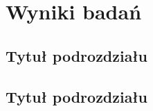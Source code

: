\chapter{Wyniki badań}
\label{chap:wyniki}



\section{Tytuł podrozdziału}


\section{Tytuł podrozdziału}

